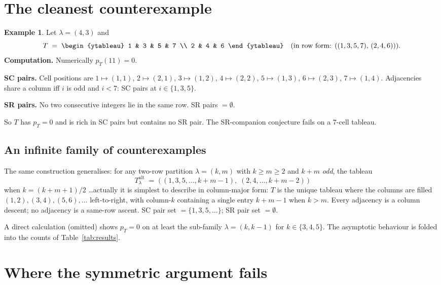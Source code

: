 \documentclass[11pt]{article}
\theoremstyle{definition}
\newtheorem{example}[theorem]{Example}
\newcommand{\la}{\lambda}
\begin{document}
\section{The cleanest counterexample}

\begin{example}\label{ex:43}
Let $\la = (4,3)$ and
\[
  T \;=\; \begin{ytableau} 1 & 3 & 5 & 7 \\ 2 & 4 & 6 \end{ytableau}
  \quad\text{(in row form: $((1,3,5,7),\,(2,4,6))$)}.
\]
\textbf{Computation.} Numerically $p_T(11) = 0$.

\textbf{SC pairs.} Cell positions are $1 \mapsto (1,1)$, $2 \mapsto (2,1)$,
$3 \mapsto (1,2)$, $4 \mapsto (2,2)$, $5 \mapsto (1,3)$, $6 \mapsto (2,3)$,
$7 \mapsto (1,4)$. Adjacencies share a column iff $i$ is odd and $i < 7$:
SC pairs at $i \in \{1, 3, 5\}$.

\textbf{SR pairs.} No two consecutive integers lie in the same row.
SR pairs $= \emptyset$.

So $T$ has $p_T = 0$ and is rich in SC pairs but contains no SR pair.
The SR-companion conjecture fails on a $7$-cell tableau.
\end{example}

\subsection{An infinite family of counterexamples}

The same construction generalises: for any two-row partition
$\la = (k, m)$ with $k \ge m \ge 2$ and $k + m$ \emph{odd}, the tableau
\[
  T_{\la}^{\text{alt}} \;=\;
  \big(\,(1, 3, 5, \dots, k + m - 1),\; (2, 4, \dots, k + m - 2)\,\big)
\]
when $k = (k+m+1)/2$ \dots actually it is simplest to describe in
column-major form: $T$ is the unique tableau where the columns are
filled $(1,2), (3,4), (5,6), \dots$ left-to-right, with column-$k$
containing a single entry $k+m-1$ when $k > m$. Every adjacency is
a column descent; no adjacency is a same-row ascent. SC pair set
$= \{1, 3, 5, \dots\}$; SR pair set $= \emptyset$.

A direct calculation (omitted) shows $p_T = 0$ on at least the
sub-family $\la = (k, k-1)$ for $k \in \{3, 4, 5\}$. The asymptotic
behaviour is folded into the counts of Table~\ref{tab:results}.

\section{Where the symmetric argument fails}
\end{document}

